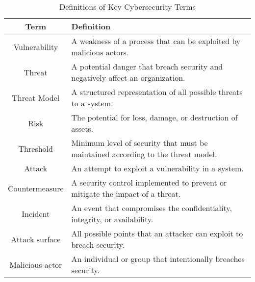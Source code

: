 \begin{table}[ht]
    \centering
    \begin{tabular}{|c|l|}
        \hline
        \textbf{Term} & \textbf{Definition} \\ \hline
        Vulnerability & A weakness of a process that can be exploited by malicious actors. \\ \hline
        Threat & A potential danger that breach security and negatively affect an organization. \\ \hline
        Threat Model & A structured representation of all possible threats to a system. \\ \hline
        Risk & The potential for loss, damage, or destruction of assets. \\ \hline
        Threshold & Minimum level of security that must be maintained according to the threat model. \\ \hline
        Attack & An attempt to exploit a vulnerability in a system. \\ \hline
        Countermeasure & A security control implemented to prevent or mitigate the impact of a threat. \\ \hline
        Incident & An event that compromises the confidentiality, integrity, or availability. \\ \hline
        Attack surface & All possible points that an attacker can exploit to breach security. \\ \hline
        Malicious actor & An individual or group that intentionally breaches security. \\ \hline
    \end{tabular}
    \caption{Definitions of Key Cybersecurity Terms}
    \label{tab:terms-full}
\end{table}